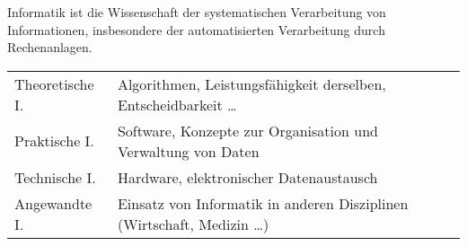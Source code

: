 Informatik ist die Wissenschaft der systematischen Verarbeitung von Informationen, insbesondere der automatisierten Verarbeitung durch Rechenanlagen.

\settowidth{\MyLenA}{Theoretische I.~~}
\begin{tabular}{@{}p{\the\MyLenA}%
				@{}p{\linewidth-\the\MyLenA}}
Theoretische I. & Algorithmen, Leistungsfähigkeit derselben, Entscheidbarkeit \dots\\
Praktische I.	& Software, Konzepte zur Organisation und Verwaltung von Daten\\
Technische I.	& Hardware, elektronischer Datenaustausch\\
Angewandte I.	& Einsatz von Informatik in anderen Disziplinen (Wirtschaft, Medizin \dots)\\
\end{tabular}